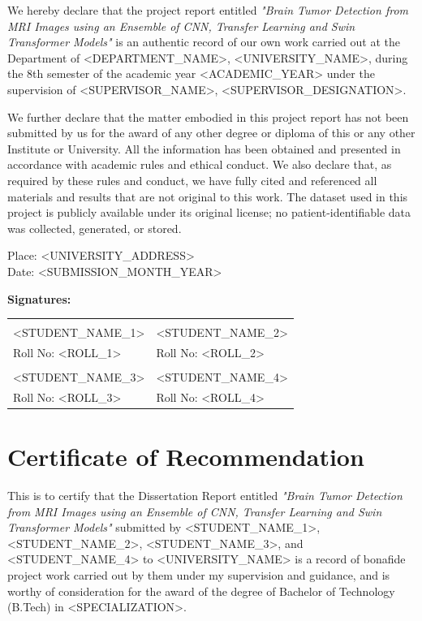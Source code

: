 \documentclass[12pt,a4paper,oneside]{report}
\begin{document}
We hereby declare that the project report entitled \textit{"Brain Tumor
Detection from MRI Images using an Ensemble of CNN, Transfer Learning and
Swin Transformer Models"} is an authentic record of our own work carried
out at the Department of <DEPARTMENT\_NAME>, <UNIVERSITY\_NAME>, during
the 8th semester of the academic year <ACADEMIC\_YEAR> under the
supervision of <SUPERVISOR\_NAME>, <SUPERVISOR\_DESIGNATION>.

We further declare that the matter embodied in this project report has not
been submitted by us for the award of any other degree or diploma of this
or any other Institute or University. All the information has been
obtained and presented in accordance with academic rules and ethical
conduct. We also declare that, as required by these rules and conduct, we
have fully cited and referenced all materials and results that are not
original to this work. The dataset used in this project is publicly
available under its original license; no patient-identifiable data was
collected, generated, or stored.

\vspace{0.8cm}
Place: <UNIVERSITY\_ADDRESS> \\
Date: <SUBMISSION\_MONTH\_YEAR>

\vspace{0.8cm}
\textbf{Signatures:}

\vspace{1.2cm}
\noindent
\begin{tabularx}{\textwidth}{XX}
\hrulefill & \hrulefill \\
<STUDENT\_NAME\_1> & <STUDENT\_NAME\_2> \\
Roll No: <ROLL\_1> & Roll No: <ROLL\_2> \\[1.2cm]
\hrulefill & \hrulefill \\
<STUDENT\_NAME\_3> & <STUDENT\_NAME\_4> \\
Roll No: <ROLL\_3> & Roll No: <ROLL\_4> \\
\end{tabularx}

\chapter*{Certificate of Recommendation}

This is to certify that the Dissertation Report entitled \textit{"Brain
Tumor Detection from MRI Images using an Ensemble of CNN, Transfer
Learning and Swin Transformer Models"} submitted by <STUDENT\_NAME\_1>,
<STUDENT\_NAME\_2>, <STUDENT\_NAME\_3>, and <STUDENT\_NAME\_4> to
<UNIVERSITY\_NAME> is a record of bonafide project work carried out by
them under my supervision and guidance, and is worthy of consideration for
the award of the degree of Bachelor of Technology (B.Tech) in
<SPECIALIZATION>.
\end{document}
